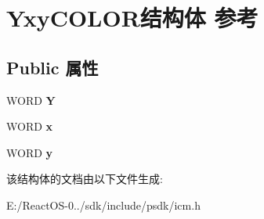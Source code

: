 \hypertarget{struct_yxy_c_o_l_o_r}{}\section{Yxy\+C\+O\+L\+O\+R结构体 参考}
\label{struct_yxy_c_o_l_o_r}
\subsection*{Public 属性}
\begin{DoxyCompactItemize}
\item 
\mbox{\label{struct_yxy_c_o_l_o_r_a2b89be5cf5db287aad072abc803ab676}} 
W\+O\+RD {\bfseries Y}
\item 
\mbox{\label{struct_yxy_c_o_l_o_r_a24d4fb96fc81807cae25f3bf085376d7}} 
W\+O\+RD {\bfseries x}
\item 
\mbox{\label{struct_yxy_c_o_l_o_r_aac15a5a6262ba8e43b50a1b19f466223}} 
W\+O\+RD {\bfseries y}
\end{DoxyCompactItemize}


该结构体的文档由以下文件生成\+:\begin{DoxyCompactItemize}
\item 
E\+:/\+React\+O\+S-\/0../sdk/include/psdk/icm.\+h\end{DoxyCompactItemize}
